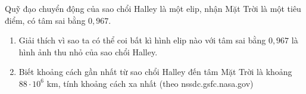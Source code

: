 

\begin{bt}%
	Quỹ đạo chuyển động của sao chổi Halley là một elip, nhận Mặt Trời là một tiêu điểm, có tâm sai bằng $0{,}967$.
	\begin{enumerate}
		\item Giải thích vì sao ta có thể coi bất kì hình elip nào với tâm sai bằng $0{,}967$ là hình ảnh thu nhỏ của sao chổi Halley.
		\item Biết khoảng cách gần nhất từ sao chổi Halley đến tâm Mặt Trời là khoảng $88\cdot 10^6$ km, tính khoảng cách xa nhất (theo nssdc.gsfc.nasa.gov)
	\end{enumerate}
	
\end{bt}

